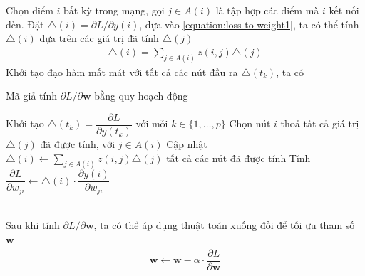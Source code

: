Chọn điểm $i$ bất kỳ trong mạng, gọi $j\in A(i)$ là tập hợp các điểm mà $i$ kết nối đến. Đặt $\triangle(i)=\partial L/\partial y(i)$, dựa vào \ref{equation:loss-to-weight1}, ta có thể tính $\triangle(i)$ dựa trên các giá trị đã tính $\triangle(j)$
\begin{align}
    \triangle(i)=\sum_{j\in A(i)}z(i,j)\triangle(j)
\end{align}
Khởi tạo đạo hàm mất mát với tất cả các nút đầu ra $\triangle(t_k)$, ta có
\begin{algorithmz}
    \caption{Mã giả tính $\partial L/\partial\mathbf{w}$ bằng quy hoạch động \cite{Aggarwal2023-zk}}
    \label{algorithm:dynamic-programming-loss-to-weight}
    \begin{algorithmic}[1]
        \State Khởi tạo $\triangle(t_k)=\dfrac{\partial L}{\partial y(t_k)}$ với mỗi $k\in\{1,\dots,p\}$
        \Repeat
        \State Chọn nút $i$ thoả tất cả giá trị $\triangle(j)$ đã được tính, với $j\in A(i)$
        \State Cập nhật $\triangle(i)\gets\sum_{j\in A(i)}z(i,j)\triangle(j)$
        \Until tất cả các nút đã được tính
        \State Tính $\dfrac{\partial L}{\partial w_{ji}}\gets\triangle(i)\cdot\dfrac{\partial y(i)}{\partial w_{ji}}$
        \EndFor
    \end{algorithmic}
\end{algorithmz}\\
Sau khi tính $\partial L/\partial\mathbf{w}$, ta có thể áp dụng thuật toán xuống đồi để tối ưu tham số $\mathbf{w}$
\begin{align}
    \mathbf{w}\leftarrow\mathbf{w}-\alpha\cdot\dfrac{\partial L}{\partial\mathbf{w}}
\end{align}

